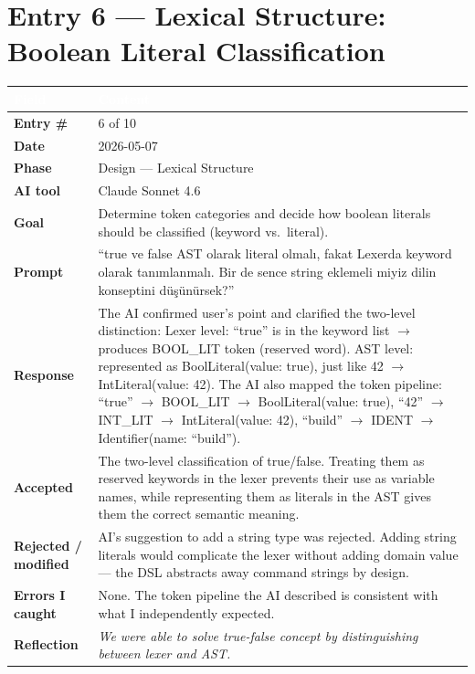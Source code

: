 \documentclass[a4paper,10pt]{article}
\begin{document}
\newpage

\section{Entry 6 --- Lexical Structure: Boolean Literal Classification}

\begin{tabular}{|
    >{\bfseries}m{3.5cm}|
    m{10cm}|
}
\hline
\rowcolor{headerblue}
\textcolor{white}{Field} & \textcolor{white}{\textbf{Content}} \\
\hline
\rowcolor{white}
Entry \#        & 6 of 10 \\
\hline
\rowcolor{altrow}
Date            & 2026-05-07 \\
\hline
\rowcolor{white}
Phase           & Design --- Lexical Structure \\
\hline
\rowcolor{altrow}
AI tool         & Claude Sonnet 4.6  \\
\hline
\rowcolor{white}
Goal            & Determine token categories and decide how boolean literals should be classified (keyword vs.\ literal). \\
\hline
\rowcolor{altrow}
Prompt          & ``true ve false AST olarak literal olmalı, fakat Lexerda keyword olarak tanımlanmalı. Bir de sence string eklemeli miyiz dilin konseptini düşünürsek?'' \\
\hline
\rowcolor{white}
Response & The AI confirmed user's point and clarified the two-level distinction: Lexer level: ``true'' is in the keyword list $\rightarrow$ produces BOOL\_LIT token (reserved word). AST level: represented as BoolLiteral(value: true), just like 42 $\rightarrow$ IntLiteral(value: 42). The AI also mapped the token pipeline: ``true'' $\rightarrow$ BOOL\_LIT $\rightarrow$ BoolLiteral(value: true), ``42'' $\rightarrow$ INT\_LIT $\rightarrow$ IntLiteral(value: 42), ``build'' $\rightarrow$ IDENT $\rightarrow$ Identifier(name: ``build''). \\
\hline
\rowcolor{altrow}
Accepted        & The two-level classification of true/false. Treating them as reserved keywords in the lexer prevents their use as variable names, while representing them as literals in the AST gives them the correct semantic meaning. \\
\hline
\rowcolor{white}
Rejected / modified & AI's suggestion to add a string type was rejected.  Adding string literals would complicate the lexer without adding domain value --- the DSL abstracts away command strings by design. \\
\hline
\rowcolor{altrow}
Errors I caught   & None. The token pipeline the AI described is consistent with what I independently expected. \\
\hline
\rowcolor{white}
Reflection & \textit{We were able to solve true-false concept by distinguishing between lexer and AST.} \\
\hline
\end{tabular}
\end{document}
